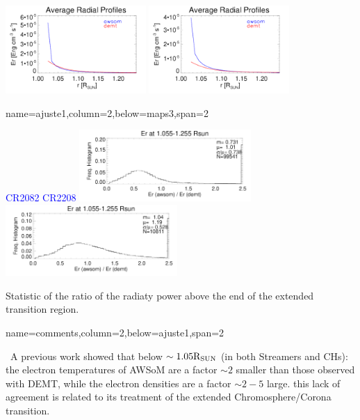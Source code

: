 \documentclass[paperwidth=100cm,paperheight=120cm]{baposter}
\def\bu{\textcolor{red}{\textbullet~}}
\def\bu{\textcolor{red}{\textbullet~}}
\def\azul#1{\textcolor{blue}{#1}}
\begin{document}
\begin{poster}
{{\begin{center}
{\includegraphics[width=0.4\textwidth]{Average_Radial_Profiles_Er_awsom_vs_demt_H_cr2082_ratio_streamer.pdf}}
{\includegraphics[width=0.4\textwidth]{Average_Radial_Profiles_Er_awsom_vs_demt_H_cr2208_ratio_streamer.pdf}}\\
\end{center}
\vskip -0.16cm

}
}

{name=ajuste1,column=2,below=maps3,span=2}{
{\footnotesize\sf
\begin{center}
\azul{\hskip 3.5cm CR2082 \hfill CR2208 \hskip 3.0cm}
{\includegraphics[width=0.49\textwidth]{comparison_Er_awsom_vs_demt_H_cr2082_ratio_streamer_ratio_range1055-1250_Rsun.pdf}}
{\includegraphics[width=0.49\textwidth]{comparison_Er_awsom_vs_demt_H_cr2208_ratio_streamer_ratio_range1055-1250_Rsun.pdf}}\\
\end{center}
Statistic of the ratio of the radiaty power above the end of the extended transition region.
}
}
{name=comments,column=2,below=ajuste1,span=2}{
{\footnotesize\sf
\bu A previous work showed that below $\sim 1.05 {\rm R_{SUN}}$ (in both Streamers and CHs): the electron temperatures of AWSoM are a factor $\sim 2$ smaller than those observed with DEMT, while the electron densities are a factor $\sim 2-5$ large. this lack of agreement is related to its treatment of the extended Chromosphere/Corona transition.

}}
\end{poster}
\end{document}
